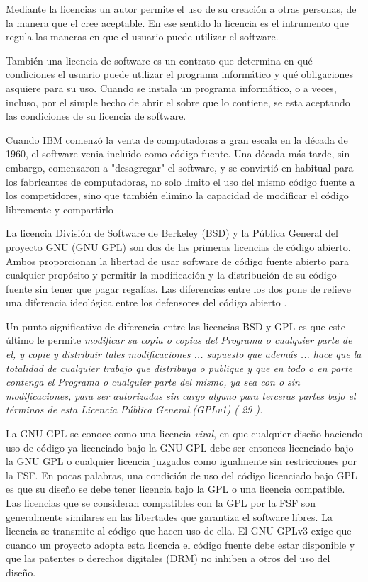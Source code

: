 \documentclass[a4paper,11pt]{article}
\begin{document}
Mediante la licencias un autor permite el uso de su creación a otras personas, de la manera que el cree aceptable. En ese sentido la licencia es el intrumento que regula las maneras en que el usuario puede utilizar el software.

También una licencia de software es un contrato que determina en qué condiciones el usuario puede utilizar el programa informático y qué obligaciones asquiere para su uso. Cuando se instala un programa informático, o a veces, incluso, por el simple hecho de abrir el sobre que lo contiene, se esta aceptando las condiciones de su licencia de software.

Cuando IBM comenzó la venta de computadoras a gran escala en la década de 1960, el software venia incluido como código fuente. Una década más tarde, sin embargo, comenzaron a "desagregar"  el software, y se convirtió en habitual para los fabricantes de computadoras, no solo limito  el uso del mismo código fuente a los competidores, sino que también elimino la capacidad de modificar el código libremente y compartirlo%

La licencia División de Software de Berkeley (BSD) y la Pública General del proyecto GNU (GNU GPL) son dos de las primeras licencias de código abierto. Ambos proporcionan la libertad de usar software de código fuente abierto para cualquier propósito y permitir la modificación y la distribución de su código fuente sin tener que pagar regalías. Las diferencias entre los dos pone de relieve una diferencia ideológica entre los defensores del código abierto .

Un punto significativo de diferencia entre las licencias BSD y GPL es que este último le permite
\textit{modificar su copia o copias del Programa o cualquier parte de el, y copie
y distribuir tales modificaciones ... supuesto que además ... hace que la
totalidad de cualquier trabajo que distribuya o publique y que en todo o en
parte contenga el Programa o cualquier parte del mismo, ya sea con o sin
modificaciones, para ser autorizadas sin cargo alguno para terceras partes bajo el
términos de esta Licencia Pública General.(GPLv1) ( 29 ). } %

La GNU GPL se conoce como una licencia \textit{viral}, en que cualquier diseño haciendo uso de código ya licenciado bajo la GNU GPL debe ser entonces licenciado bajo la
GNU GPL o cualquier licencia juzgados como igualmente sin restricciones por la FSF. En pocas palabras, una condición de uso del código licenciado bajo GPL es que su diseño se debe tener licencia bajo la GPL o una licencia compatible. Las licencias que se consideran compatibles con la GPL por la FSF son generalmente similares en las libertades que garantiza el software libres. La licencia se transmite al código que hacen uso de ella. El GNU GPLv3 exige que cuando un proyecto adopta esta licencia el código fuente debe estar disponible y que las patentes o derechos digitales (DRM) no inhiben a otros del uso del diseño. 
\end{document}
